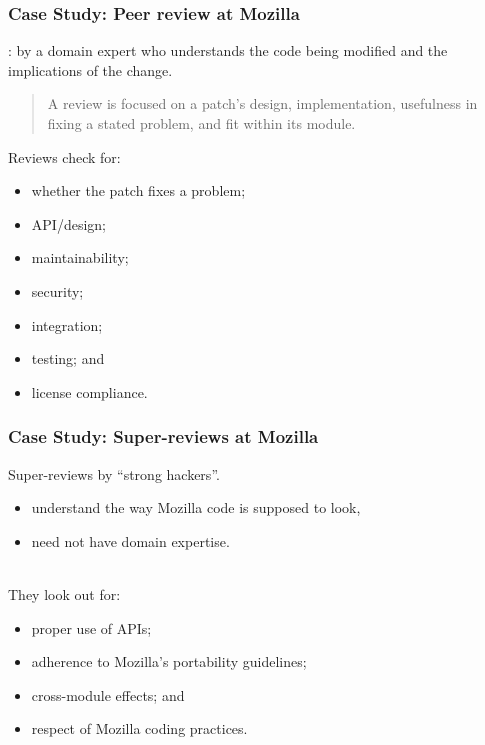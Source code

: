 \begin{frame}
\frametitle{Case Study: Peer review at Mozilla}
\begin{changemargin}{1cm}
: by a domain expert who understands the code
being modified and the implications of the change.  

\begin{quote} 
A
review is focused on a patch's design, implementation, usefulness in
fixing a stated problem, and fit within its module.
\end{quote}

Reviews check for: 
\begin{itemize}
\item whether the patch fixes a problem; 
\item API/design; 
\item maintainability; 
\item security; 
\item integration; 
\item testing; and
\item license compliance.
\end{itemize}
\end{changemargin}
\end{frame}

\begin{frame}
\frametitle{Case Study: Super-reviews at Mozilla}

\begin{changemargin}{1cm}
Super-reviews by ``strong hackers''.
\begin{itemize}
\item understand the way
Mozilla code is supposed to look,
\item need not have domain expertise.
\end{itemize}
~\\[1em]

They look out
for: 
\begin{itemize}
\item proper use of APIs; 
\item adherence to Mozilla's portability
guidelines; 
\item cross-module effects; and 
\item respect of Mozilla coding
practices.
\end{itemize}

\end{changemargin}
\end{frame}

